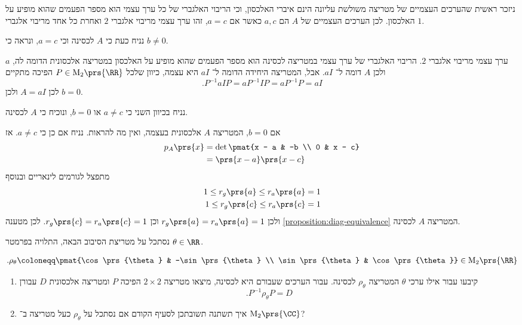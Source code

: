 \documentclass[a4paper,10pt,twoside,openany]{book}
\renewcommand{\Mat}{\mathrm{M}}
\begin{document}
\begin{solution}
ניזכר ראשית שהערכים העצמיים של מטריצה משולשת עליונה הינם איברי האלכסון, וכי הריבוי האלגברי של כל ערך עצמי הוא מספר הפעמים שהוא מופיע על האלכסון. לכן הערכים העצמיים של
$A$
הם
$a,c$
כאשר אם
$a = c$,
זהו ערך עצמי מריבוי אלגברי
$2$
ואחרת כל אחד מריבוי אלגברי
$1$.

נניח כעת כי
$A$
לכסינה וכי
$a=c$,
ונראה כי
$b \neq 0$.

$a$
ערך עצמי מריבוי אלגברי
$2$.
הריבוי האלגברי של ערך עצמי במטריצה לכסינה הוא מספר הפעמים שהוא מופיע על האלכסון במטריצה אלכסונית הדומה לה, ולכן
$A$
דומה ל־%
$a I$.
אבל, המטריצה היחידה הדומה ל־%
$a I$
היא עצמה, כיוון שלכל
$P \in \Mat_2\prs{\RR}$
הפיכה מתקיים
\[\text{.} P^{-1} a I P = a P^{-1} I P = a P^{-1} P = a I\]
לכן
$A = aI$
ולכן
$b = 0$.

נניח בכיוון השני כי
$a \neq c$
או
$b = 0$,
ונוכיח כי
$A$
לכסינה.

אם
$b = 0$,
המטריצה
$A$
אלכסונית בעצמה, ואין מה להראות. נניח אם כן כי
$a \neq c$.
אז
\begin{align*}
p_A\prs{x} &= \det\pmat{x - a & -b \\ 0 & x - c}
\\&= \prs{x-a}\prs{x-c}
\end{align*}
מתפצל לגורמים לינאריים ובנוסף
\begin{align*}
1 \leq r_g\prs{a} \leq r_a\prs{a} = 1 \\
1 \leq r_g\prs{c} \leq r_a\prs{c} = 1
\end{align*}
ולכן
$r_g\prs{a} = r_a\prs{a} = 1$
וכן
$r_g\prs{c} = r_a\prs{c} = 1$.
לכן מטענה
\ref{proposition:diag-equivalence}
המטריצה
$A$
לכסינה.
\end{solution}

\begin{exercisechap}
נסתכל על מטריצת הסיבוב הבאה, התלויה בפרמטר
$\theta \in \RR$.

\begin{align*}
\text{.} \rho_\theta \coloneqq \pmat{\cos\prs{\theta} & -\sin\prs{\theta} \\ \sin\prs{\theta} & \cos\prs{\theta}} \in \Mat_2\prs{\RR}
\end{align*}

\begin{enumerate}
\item קיבעו עבור אילו ערכי
$\theta$
המטריצה
$\rho_\theta$
לכסינה. עבור הערכים שעבורם היא לכסינה, מיצאו מטריצה
$2 \times 2$
הפיכה
$P$
ומטריצה אלכסונית
$D$
עבורן
\[\text{.} P^{-1} \rho_\theta P = D\]

\item איך תשתנה תשובתכן לסעיף הקודם אם נסתכל על
$\rho_\theta$
כעל מטריצה ב־%
$\Mat_2\prs{\CC}$?
\end{enumerate}
\end{exercisechap}
\end{document}
